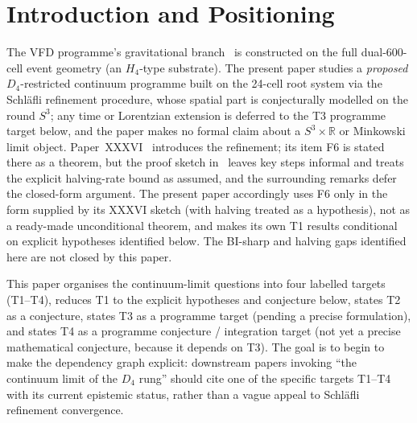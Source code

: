 \documentclass[12pt]{article}
\theoremstyle{definition}
\theoremstyle{remark}
\begin{document}
\begin{abstract}
This paper is presented as a \emph{programme paper for the GR-continuum branch}: it states the four targets, records what can be proved at the current level of the programme (conditional reductions, not unconditional theorems), and identifies what remains open. It is \emph{not} a complete rigorous foundation for VFD general relativity; it is the specification of what such a foundation must establish, and it does not yet close the BI-sharp or halving gaps.
\end{abstract}

\section{Introduction and Positioning}\label{sec:intro}

The VFD programme's gravitational branch~\citep{SmartXXIII, SmartXXIV, SmartXXV, SmartXXVI, SmartXXVII, SmartXXVIII} is constructed on the full dual-600-cell event geometry (an $H_4$-type substrate). The present paper studies a \emph{proposed} $D_4$-restricted continuum programme built on the 24-cell root system via the Schl\"afli refinement procedure, whose spatial part is conjecturally modelled on the round $S^3$; any time or Lorentzian extension is deferred to the T3 programme target below, and the paper makes no formal claim about a $S^3 \times \mathbb{R}$ or Minkowski limit object. Paper~XXXVI~\citep{SmartXXXVI} introduces the refinement; its item F6 is stated there as a theorem, but the proof sketch in~\citep{SmartXXXVI} leaves key steps informal and treats the explicit halving-rate bound as assumed, and the surrounding remarks defer the closed-form argument. The present paper accordingly uses F6 only in the form supplied by its XXXVI sketch (with halving treated as a hypothesis), not as a ready-made unconditional theorem, and makes its own T1 results conditional on explicit hypotheses identified below. The BI-sharp and halving gaps identified here are not closed by this paper.

This paper organises the continuum-limit questions into four labelled targets (T1--T4), reduces T1 to the explicit hypotheses and conjecture below, states T2 as a conjecture, states T3 as a programme target (pending a precise formulation), and states T4 as a programme conjecture / integration target (not yet a precise mathematical conjecture, because it depends on T3). The goal is to begin to make the dependency graph explicit: downstream papers invoking ``the continuum limit of the $D_4$ rung'' should cite one of the specific targets T1--T4 with its current epistemic status, rather than a vague appeal to Schl\"afli refinement convergence.
\end{document}
